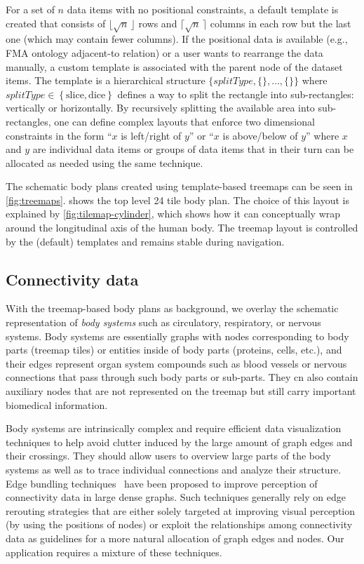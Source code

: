 For a set of $n$ data items with no positional constraints, a default template is created that consists of $\lfloor \sqrt{n}\, \rfloor$ rows and $\lceil \sqrt{n}\, \rceil$ columns in each row but the last one (which may contain fewer columns). If the positional data is available (e.g., FMA ontology adjacent-to relation) or a user wants to rearrange the data manually, a custom template is associated with the parent node of the dataset items. The template is a hierarchical structure
$\bigl\{\mathit{splitType}, \{\},\ldots, \{\}\bigr\}$ where $\mathit{splitType} \in \left\{\mathrm{slice}, \mathrm{dice}\right\}$ defines a way to split the rectangle into sub-rectangles: vertically or horizontally. By recursively splitting the available area into sub-rectangles, one can define complex layouts that enforce two dimensional constraints in the form ``$x$ is left/right of $y$'' or ``$x$ is above/below of $y$'' where $x$ and $y$ are individual data items or groups of data items that in their turn can be allocated as needed using the same technique.

The schematic body plans created using template-based treemaps can be seen in \cref{fig:treemaps}.  shows the top level 24 tile body plan. The choice of this layout is explained by \cref{fig:tilemap-cylinder}, which shows how it can conceptually wrap around the longitudinal axis of the human body. The treemap layout is controlled by the (default) templates and remains stable during navigation.


\subsection{Connectivity data} %

With the treemap-based body plans as background, we overlay the schematic representation of \emph{body systems} such as circulatory, respiratory, or nervous systems. Body systems are essentially graphs with nodes corresponding to body parts (treemap tiles) or entities inside of body parts (proteins, cells, etc.), and their edges represent organ system compounds such as blood vessels or nervous connections that pass through such body parts or sub-parts.
They cn also contain auxiliary nodes that are not represented on the treemap but still carry important biomedical information. 

Body systems are intrinsically complex and require efficient data visualization techniques to help avoid clutter induced by the large amount of graph edges and their crossings. They should allow users to overview large parts of the body systems as well as to trace individual connections and analyze their structure. Edge bundling techniques~\cite{Hol06,GHN+11,HET12} have been proposed to improve perception of connectivity data in large dense graphs.
Such techniques generally rely on edge rerouting strategies that are either solely targeted at improving visual perception (by using the positions of nodes) or exploit the relationships among connectivity data as guidelines for a more natural allocation of graph edges and nodes. Our application requires a mixture of these techniques.

